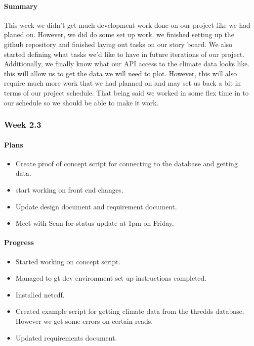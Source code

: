 \documentclass[onecolumn, draftclsnofoot,10pt, compsoc]{article}
\begin{document}
			\paragraph{Summary}\hfill \break
			This week we didn't get much development work done on our project like we had planed on. However, we did do some set up work. we finished setting up the github repository and finished laying out tasks on our story board. We also started defining what tasks we'd like to have in future iterations of our project. Additionally, we finally know what our API access to the climate data looks like. this will allow us to get the data we will need to plot. However, this will also require much more work that we had planned on and may set us back a bit in terms of our project schedule. That being said we worked in some flex time in to our schedule so we should be able to make it work.\\

		\subsubsection{Week 2.3}
			\paragraph{Plans} \hfill \break
				\begin{itemize}
					\item Create proof of concept script for connecting to the database and getting data.
					\item start working on front end changes.
					\item Update design document and requirement document.
					\item Meet with Sean for status update at 1pm on Friday.
				\end{itemize}
			\paragraph{Progress} \hfill \break
				\begin{itemize}
					\item Started working on concept script.
					\item Managed to gt dev environment set up instructions completed.
					\item Installed netcdf.
					\item Created example script for getting climate data from the thredds database. However we get some errors on certain reads.
					\item Updated requirements document.
				\end{itemize}
\end{document}
